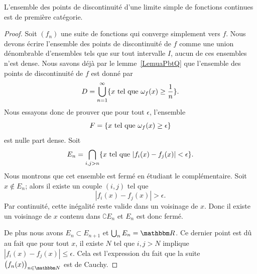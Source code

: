 \begin{theorem}
    L'ensemble des points de discontinuité d'une limite simple de fonctions continues est de première catégorie.
\end{theorem}

\begin{proof}
    Soit \( (f_n)\) une suite de fonctions qui converge simplement vers \( f\). Nous devons écrire l'ensemble des points de discontinuité de \( f\) comme une union dénombrable d'ensembles tels que sur tout intervalle \( I\), aucun de ces ensembles n'est dense. Nous savons déjà par le lemme~\ref{LemuaPbtQ} que l'ensemble des points de discontinuité  de \( f\) est donné par
    \begin{equation}
        D=\bigcup_{n=1}^{\infty}\{ x\text{ tel que } \omega_f(x)\geq \frac{1}{  n } \}.
    \end{equation}
    Nous essayons donc de prouver que pour tout \( \epsilon\), l'ensemble
    \begin{equation}
        F=\{ x\text{ tel que } \omega_f(x)\geq \epsilon \}
    \end{equation}
    est nulle part dense. Soit
    \begin{equation}
        E_n=\bigcap_{i,j>n}\{ x\text{ tel que } | f_i(x)-f_j(x) |<\epsilon \}.
    \end{equation}
    Nous montrons que cet ensemble est fermé en étudiant le complémentaire. Soit \( x\notin E_n\); alors il existe un couple \( (i,j)\) tel que
    \begin{equation}
        | f_i(x)-f_j(x) |>\epsilon.
    \end{equation}
    Par continuité, cette inégalité reste valide dans un voisinage de \( x\). Donc il existe un voisinage de \( x\) contenu dans \( \complement E_n\) et \( E_n\) est donc fermé.

    De plus nous avons \( E_n\subset E_{n+1}\) et \( \bigcup_nE_n=\eR\). Ce dernier point est dû au fait que pour tout \( x\), il existe \( N\) tel que \( i,j>N\) implique \( | f_i(x)-f_j(x) |\leq \epsilon\). Cela est l'expression du fait que la suite \( \big( f_n(x) \big)_{n\in \eN}\) est de Cauchy.


\end{proof}
